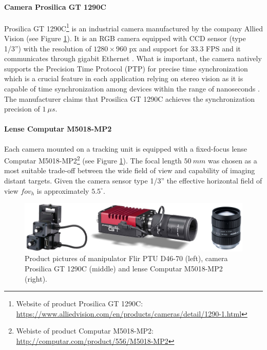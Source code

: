\paragraph{Camera Prosilica GT 1290C} Prosilica GT 1290C\footnote{Website of product Prosilica GT 1290C: \url{https://www.alliedvision.com/en/products/cameras/detail/1290-1.html}} is an industrial camera manufactured by the company Allied Vision (see Figure \ref{fig:prosilica_gt1290c_flir_ptud4670}). It is an RGB camera equipped with CCD sensor (type 1/3'') with the resolution of $1280 \times 960$ px and support for $33.3$ FPS and it communicates through gigabit Ethernet \cite{Prosilica_gt1290c}. What is important, the camera natively supports the Precision Time Protocol (PTP) for precise time synchronization which is a crucial feature in each application relying on stereo vision as it is capable of time synchronization among devices within the range of nanoseconds \cite{PTP}. The manufacturer claims that Prosilica GT 1290C achieves the synchronization precision of $1~\mu s$.

\paragraph{Lense Computar M5018-MP2} Each camera mounted on a tracking unit is equipped with a fixed-focus lense Computar M5018-MP2\footnote{Webiste of product Computar M5018-MP2: \url{http://computar.com/product/556/M5018-MP2}} (see Figure \ref{fig:prosilica_gt1290c_flir_ptud4670}). The focal length $50~mm$ was chosen as a most suitable trade-off between the wide field of view and capability of imaging distant targets. Given the camera sensor type 1/3'' the effective horizontal field of view $fov_{h}$ is approximately $5.5^{\circ}$.

\begin{figure}[htb]
	\centering
	\includegraphics[width=0.9\linewidth]{fig/prosilica_gt1290c_flir_ptud4670_computar.png}
	\caption{Product pictures of manipulator Flir PTU D46-70 (left), camera Prosilica GT 1290C (middle) and lense Computar M5018-MP2 (right).}
	\label{fig:prosilica_gt1290c_flir_ptud4670}
\end{figure}

